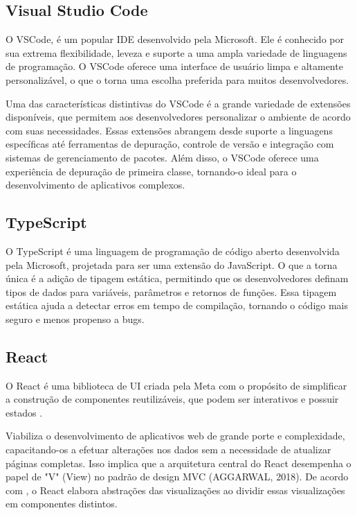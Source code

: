 \subsection{Visual Studio Code}\label{subsec:vscode}

O \gls{VSCode}, é um popular \gls{IDE} desenvolvido pela Microsoft. Ele é conhecido por sua extrema flexibilidade, leveza e suporte a uma ampla variedade de linguagens de programação. O \gls{VSCode} oferece uma interface de usuário limpa e altamente personalizável, o que o torna uma escolha preferida para muitos desenvolvedores.

Uma das características distintivas do \gls{VSCode} é a grande variedade de extensões disponíveis, que permitem aos desenvolvedores personalizar o ambiente de acordo com suas necessidades. Essas extensões abrangem desde suporte a linguagens específicas até ferramentas de depuração, controle de versão e integração com sistemas de gerenciamento de pacotes. Além disso, o \gls{VSCode} oferece uma experiência de depuração de primeira classe, tornando-o ideal para o desenvolvimento de aplicativos complexos.

\subsection{TypeScript}\label{subsec:typescript}

O TypeScript é uma linguagem de programação de código aberto desenvolvida pela Microsoft, projetada para ser uma extensão do JavaScript. O que a torna única é a adição de tipagem estática, permitindo que os desenvolvedores definam tipos de dados para variáveis, parâmetros e retornos de funções. Essa tipagem estática ajuda a detectar erros em tempo de compilação, tornando o código mais seguro e menos propenso a bugs. 

\subsection{React}\label{subsec:react}

O React é uma biblioteca de \gls{UI} criada pela Meta com o propósito de simplificar a construção de componentes reutilizáveis, que podem ser interativos e possuir estados \cite{Kumar:2016:ComparativeAnalysisAngularJSReactJS}.

Viabiliza o desenvolvimento de aplicativos web de grande porte e complexidade, capacitando-os a efetuar alterações nos dados sem a necessidade de atualizar páginas completas. Isso implica que a arquitetura central do React desempenha o papel de "V" (View) no padrão de design \gls{MVC} (AGGARWAL, 2018). De acordo com , o React elabora abstrações das visualizações ao dividir essas visualizações em componentes distintos.

